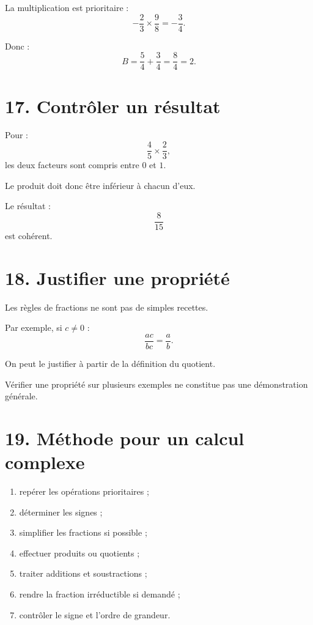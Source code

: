La multiplication est prioritaire :
\[
-\dfrac23\times\dfrac98=-\dfrac34.
\]

Donc :
\[
B=\dfrac54+\dfrac34=\dfrac84=2.
\]

\section{17. Contrôler un résultat}

Pour :
\[
\dfrac45\times\dfrac23,
\]
les deux facteurs sont compris entre $0$ et $1$.

Le produit doit donc être inférieur à chacun d'eux.

Le résultat :
\[
\dfrac8{15}
\]
est cohérent.

\section{18. Justifier une propriété}

Les règles de fractions ne sont pas de simples recettes.

Par exemple, si $c\neq0$ :
\[
\dfrac{ac}{bc}=\dfrac ab.
\]

On peut le justifier à partir de la définition du quotient.

\begin{remarque}
Vérifier une propriété sur plusieurs exemples ne constitue pas une démonstration générale.
\end{remarque}

\section{19. Méthode pour un calcul complexe}

\begin{methode}
\begin{enumerate}
\item repérer les opérations prioritaires ;
\item déterminer les signes ;
\item simplifier les fractions si possible ;
\item effectuer produits ou quotients ;
\item traiter additions et soustractions ;
\item rendre la fraction irréductible si demandé ;
\item contrôler le signe et l'ordre de grandeur.
\end{enumerate}
\end{methode}

